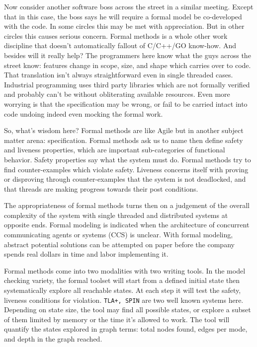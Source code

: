 \documentclass[twocolumn]{article}
\begin{document}
Now consider another software boss across the street in a similar meeting. Except that in this case, the boss says he will require a formal model be co-developed with the code. In some circles this may be met with appreciation. But in other circles this causes serious concern. Formal methods is a whole other work discipline that doesn't automatically fallout of C/C++/GO know-how. And besides will it really help? The programmers here know what the guys across the street know: features change in scope, size, and shape which carries over to code. That translation isn't always  straightforward even in single threaded cases. Industrial programming uses third party libraries which are not formally verified and probably can't be without obliterating available resources. Even more worrying is that the specification may be wrong, or fail to be carried intact into code undoing indeed even mocking the formal work.

So, what's wisdom here? Formal methods are like Agile but in another subject matter arena: specification. Formal methods ask us to name then define safety and liveness properties, which are important sub-categories of functional behavior. Safety properties say what the system must do. Formal methods try to find counter-examples which violate safety. Liveness concerns itself with proving or disproving through counter-examples that the system is not deadlocked, and that threads are making progress towards their post conditions. 

The appropriateness of formal methods turns then on a judgement of the overall complexity of the system with single threaded and distributed systems at opposite ends. Formal modeling is indicated when the architecture of concurrent communicating agents or systems (CCS) is unclear. With formal modeling, abstract potential solutions can be attempted on paper before the company spends real dollars in time and labor implementing it.

Formal methods come into two modalities with two writing tools. In the model checking variety, the formal toolset will start from a defined initial state then systematically explore all reachable states. At each step it will test the safety, liveness conditions for violation. \texttt{TLA+, SPIN} are two well known systems here. Depending on state size, the tool may find all possible states, or explore a subset of them limited by memory or the time it's allowed to work. The tool will quantify the states explored in graph terms: total nodes found, edges per mode, and depth in the graph reached.
\end{document}
